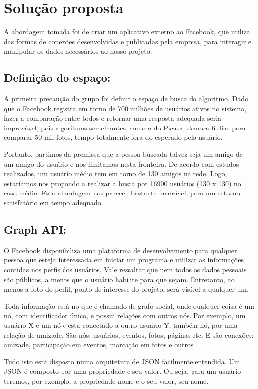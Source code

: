 \documentclass[10pt,a4paper]{article}
\begin{document}
\section{Solução proposta}
A abordagem tomada foi de criar um aplicativo externo ao Facebook, que utiliza das formas de conexões desenvolvidas e publicadas pela empresa, para interagir e manipular os dados necessários ao nosso projeto.
\subsection*{Definição do espaço:}

	A primeira precaução do grupo foi definir o espaço de busca do algoritmo. Dado que o Facebook registra em torno de 700 milhões de usuários ativos no sistema, fazer a comparação entre todos e retornar uma resposta adequada seria improvável, pois algoritmos semelhantes, como o do Picasa, demora 6 dias para comparar 50 mil fotos, tempo totalmente fora do esperado pelo usuário.

	Portanto, partimos da premissa que a pessoa buscada talvez
        seja um amigo de um amigo do usuário e nos limitamos nesta
        fronteira. De acordo com estudos realizados, um usuário médio
        tem em torno de 130 amigos na rede. Logo, estaríamos nos
        propondo a realizar a busca por 16900 usuários (130 x 130) no
        caso médio. Esta abordagem nos pareceu bastante favorável,
        para um retorno satisfatório em tempo adequado.

\subsection*{Graph API:}
O Facebook disponibiliza uma plataforma de desenvolvimento para qualquer pessoa que esteja interessada em iniciar um programa e utilizar as informações contidas nos perfis dos usuários. Vale ressaltar que nem todos os dados pessoais são públicos, a menos que o usuário habilite para que sejam. Entretanto, ao menos a foto do perfil, ponto de interesse do projeto, será visível a qualquer um.

	Toda informação está no que é chamado de grafo social, onde qualquer coisa é um nó, com identificador único, e possui relações com outros nós. Por exemplo, um usuário X é um nó e está conectado a outro usuário Y, também nó, por uma relação de amizade. São nós: usuários, eventos, fotos, páginas etc. E são conexões: amizade, participação em eventos, marcação em fotos e outros.

	Tudo isto está disposto numa arquitetura de JSON facilmente entendida. Um JSON é composto por uma propriedade e seu valor. Ou seja, para um usuário teremos, por exemplo, a propriedade nome e o seu valor, seu nome.
\end{document}

